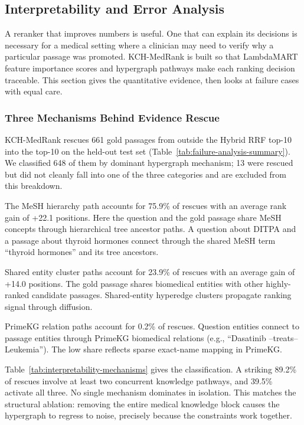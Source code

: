 \subsection{Interpretability and Error Analysis}
\label{sec:interpretability}

A reranker that improves numbers is useful. One that can explain its decisions is necessary for a medical setting where a clinician may need to verify why a particular passage was promoted. KCH-MedRank is built so that LambdaMART feature importance scores and hypergraph pathways make each ranking decision traceable. This section gives the quantitative evidence, then looks at failure cases with equal care.

\subsubsection{Three Mechanisms Behind Evidence Rescue}

KCH-MedRank rescues 661 gold passages from outside the Hybrid RRF top-10 into the top-10 on the held-out test set (Table~\ref{tab:failure-analysis-summary}). We classified 648 of them by dominant hypergraph mechanism; 13 were rescued but did not cleanly fall into one of the three categories and are excluded from this breakdown.

The MeSH hierarchy path accounts for 75.9\% of rescues with an average rank gain of +22.1 positions. Here the question and the gold passage share MeSH concepts through hierarchical tree ancestor paths. A question about DITPA and a passage about thyroid hormones connect through the shared MeSH term ``thyroid hormones'' and its tree ancestors.

Shared entity cluster paths account for 23.9\% of rescues with an average gain of +14.0 positions. The gold passage shares biomedical entities with other highly-ranked candidate passages. Shared-entity hyperedge clusters propagate ranking signal through diffusion.

PrimeKG relation paths account for 0.2\% of rescues. Question entities connect to passage entities through PrimeKG biomedical relations (e.g., ``Dasatinib --treats-- Leukemia''). The low share reflects sparse exact-name mapping in PrimeKG.



Table~\ref{tab:interpretability-mechanisms} gives the classification. A striking 89.2\% of rescues involve at least two concurrent knowledge pathways, and 39.5\% activate all three. No single mechanism dominates in isolation. This matches the structural ablation: removing the entire medical knowledge block causes the hypergraph to regress to noise, precisely because the constraints work together.

